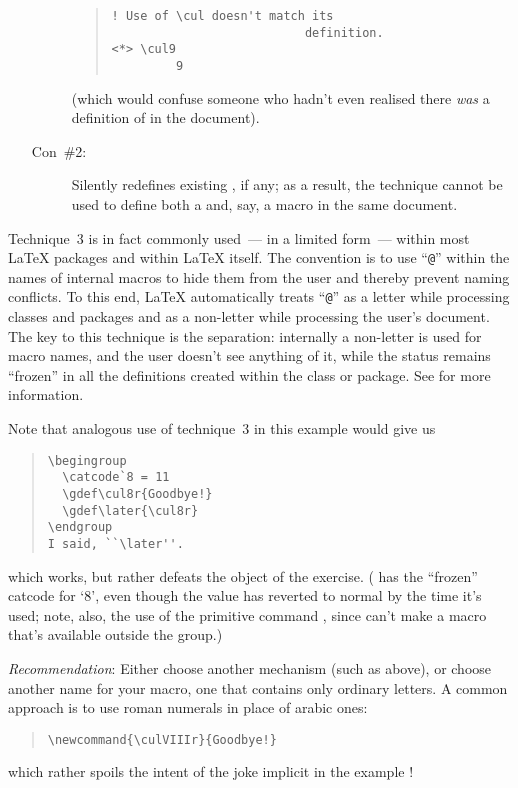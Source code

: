 \begin{enumerate}
\begin{description}
\begin{quote}
\begin{wideversion}
\end{wideversion}
\begin{narrowversion}
\begin{verbatim}
! Use of \cul doesn't match its 
                           definition.
<*> \cul9
         9
\end{verbatim}
\end{narrowversion}
\end{quote}
    (which would confuse someone who hadn't even realised there
    \emph{was} a definition of  in the document).
  \item[Con~\#2:] Silently redefines existing , if any;
    as a result, the technique cannot be used to define both a
     and, say, a  macro in the same
    document.
  \end{description}
\end{enumerate}
Technique~3 is in fact commonly used~--- in a limited form~--- within
most \LaTeX{} packages and within \LaTeX{} itself.  The convention is to
use ``\texttt{@}'' within the names of internal macros to hide them
from the user and thereby prevent naming conflicts.  To this end,
\LaTeX{} automatically treats ``\texttt{@}'' as a letter while
processing classes and packages and as a non-letter while processing
the user's document.  The key to this technique is the separation:
internally a non-letter is used for macro names, and the user doesn't
see anything of it, while the status remains ``frozen'' in all the
definitions created within the class or package.  See %
 for
more information.

Note that analogous use of technique~3 in this example would give us
\begin{quote}
\begin{verbatim}
\begingroup
  \catcode`8 = 11 
  \gdef\cul8r{Goodbye!}
  \gdef\later{\cul8r}
\endgroup
I said, ``\later''.
\end{verbatim}
\end{quote}
which works, but rather defeats the object of the exercise.
( has the ``frozen'' catcode for `8', even though the value
has reverted to normal by the time it's used; note, also, the use of
the primitive command , since  can't make a
macro that's available outside the group.)

\emph{Recommendation}: Either choose another mechanism (such as
 above), or choose another name for your macro, one
that contains only ordinary letters.  A common approach is to use
roman numerals in place of arabic ones:
\begin{quote}
\begin{verbatim}
\newcommand{\culVIIIr}{Goodbye!}
\end{verbatim}
\end{quote}
which rather spoils the intent of the joke implicit in the example
!

